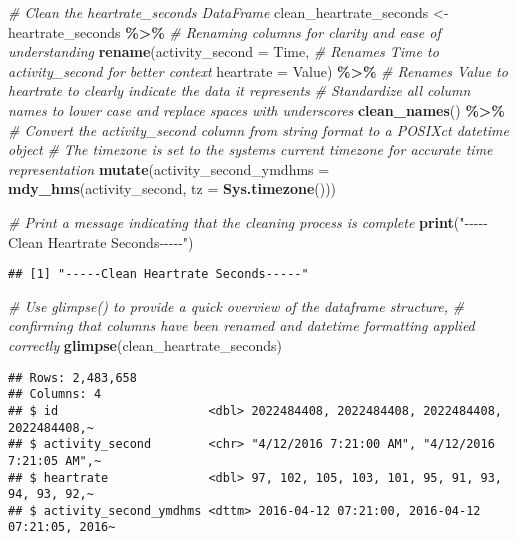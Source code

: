 \documentclass[
]{article}
\newenvironment{Shaded}{\begin{snugshade}}{\end{snugshade}}
\newcommand{\AttributeTok}[1]{\textcolor[rgb]{0.13,0.29,0.53}{#1}}
\newcommand{\CommentTok}[1]{\textcolor[rgb]{0.56,0.35,0.01}{\textit{#1}}}
\newcommand{\FunctionTok}[1]{\textcolor[rgb]{0.13,0.29,0.53}{\textbf{#1}}}
\newcommand{\NormalTok}[1]{#1}
\newcommand{\OtherTok}[1]{\textcolor[rgb]{0.56,0.35,0.01}{#1}}
\newcommand{\SpecialCharTok}[1]{\textcolor[rgb]{0.81,0.36,0.00}{\textbf{#1}}}
\newcommand{\StringTok}[1]{\textcolor[rgb]{0.31,0.60,0.02}{#1}}
\begin{document}
\begin{Shaded}
\begin{Highlighting}[]
\CommentTok{\# Clean the heartrate\_seconds DataFrame}
\NormalTok{clean\_heartrate\_seconds }\OtherTok{\textless{}{-}}\NormalTok{ heartrate\_seconds }\SpecialCharTok{\%\textgreater{}\%}
  \CommentTok{\# Renaming columns for clarity and ease of understanding}
  \FunctionTok{rename}\NormalTok{(}\AttributeTok{activity\_second =}\NormalTok{ Time,     }\CommentTok{\# Renames \textquotesingle{}Time\textquotesingle{} to \textquotesingle{}activity\_second\textquotesingle{} for better context}
         \AttributeTok{heartrate =}\NormalTok{ Value) }\SpecialCharTok{\%\textgreater{}\%}      \CommentTok{\# Renames \textquotesingle{}Value\textquotesingle{} to \textquotesingle{}heartrate\textquotesingle{} to clearly indicate the data it represents}
  \CommentTok{\# Standardize all column names to lower case and replace spaces with underscores}
  \FunctionTok{clean\_names}\NormalTok{() }\SpecialCharTok{\%\textgreater{}\%}
  \CommentTok{\# Convert the activity\_second column from string format to a POSIXct datetime object}
  \CommentTok{\# The timezone is set to the system\textquotesingle{}s current timezone for accurate time representation}
  \FunctionTok{mutate}\NormalTok{(}\AttributeTok{activity\_second\_ymdhms =} \FunctionTok{mdy\_hms}\NormalTok{(activity\_second, }\AttributeTok{tz =} \FunctionTok{Sys.timezone}\NormalTok{()))}

\CommentTok{\# Print a message indicating that the cleaning process is complete}
\FunctionTok{print}\NormalTok{(}\StringTok{"{-}{-}{-}{-}{-}Clean Heartrate Seconds{-}{-}{-}{-}{-}"}\NormalTok{)}
\end{Highlighting}
\end{Shaded}

\begin{verbatim}
## [1] "-----Clean Heartrate Seconds-----"
\end{verbatim}

\begin{Shaded}
\begin{Highlighting}[]
\CommentTok{\# Use glimpse() to provide a quick overview of the dataframe structure,}
\CommentTok{\# confirming that columns have been renamed and datetime formatting applied correctly}
\FunctionTok{glimpse}\NormalTok{(clean\_heartrate\_seconds)}
\end{Highlighting}
\end{Shaded}

\begin{verbatim}
## Rows: 2,483,658
## Columns: 4
## $ id                     <dbl> 2022484408, 2022484408, 2022484408, 2022484408,~
## $ activity_second        <chr> "4/12/2016 7:21:00 AM", "4/12/2016 7:21:05 AM",~
## $ heartrate              <dbl> 97, 102, 105, 103, 101, 95, 91, 93, 94, 93, 92,~
## $ activity_second_ymdhms <dttm> 2016-04-12 07:21:00, 2016-04-12 07:21:05, 2016~
\end{verbatim}
\end{document}
